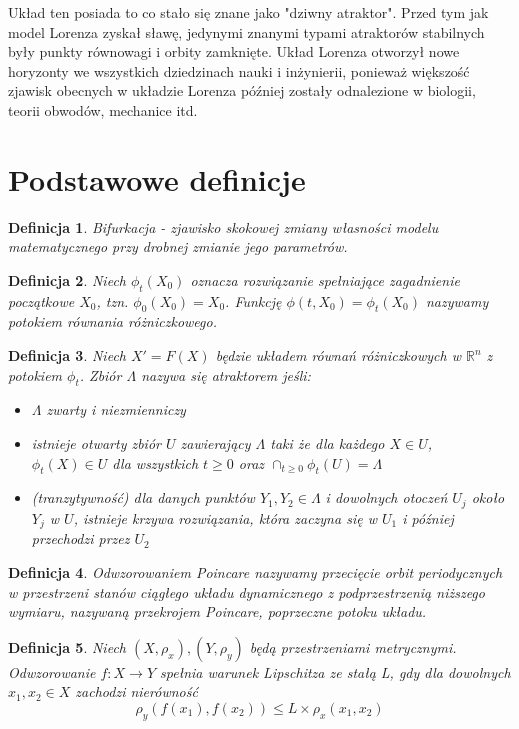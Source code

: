 \documentclass[12pt]{report}
\newtheorem{definition}{Definicja}
\newcommand{\R}{\mathbb{R}}
\begin{document}
	\par Układ ten posiada to co stało się znane jako "dziwny atraktor". Przed tym jak model Lorenza zyskał sławę, jedynymi znanymi typami atraktorów stabilnych były punkty równowagi i orbity zamknięte. Układ Lorenza otworzył nowe horyzonty we wszystkich dziedzinach nauki i inżynierii, ponieważ większość zjawisk obecnych w układzie Lorenza później zostały odnalezione w biologii, teorii obwodów, mechanice itd. \cite{HSD}
	
	\section{Podstawowe definicje}
	\begin{definition}
		Bifurkacja - zjawisko skokowej zmiany własności modelu matematycznego przy drobnej zmianie jego parametrów.
	\end{definition}
	\begin{definition}
		Niech $\phi_t (X_0)$ oznacza rozwiązanie spełniające zagadnienie początkowe $X_0$, tzn. $\phi_0 (X_0) = X_0$. Funkcję $\phi(t, X_0) = \phi_t(X_0)$ nazywamy potokiem równania różniczkowego.
	\end{definition}
	\begin{definition}
		Niech $X' = F(X)$ będzie układem równań różniczkowych w $\R^n$ z potokiem $\phi_t$. Zbiór $\Lambda$ nazywa się atraktorem jeśli:
		\begin{itemize}
			\item $\Lambda$ zwarty i niezmienniczy
			\item istnieje otwarty zbiór $U$ zawierający $\Lambda$ taki że dla każdego $X \in U$, $\phi_t(X) \in U$ dla wszystkich $t \ge 0$ oraz $\cap_{t \ge 0} \phi_t(U) = \Lambda$
			\item (tranzytywność) dla danych punktów $Y_1, Y_2 \in \Lambda$ i dowolnych otoczeń $U_j$ około $Y_j$ w $U$, istnieje krzywa rozwiązania, która zaczyna się w $U_1$ i później przechodzi przez $U_2$
		\end{itemize}
	\end{definition}
	\begin{definition}
		Odwzorowaniem Poincare nazywamy przecięcie orbit periodycznych w przestrzeni stanów ciągłego układu dynamicznego z podprzestrzenią niższego wymiaru, nazywaną przekrojem Poincare, poprzeczne potoku układu.
	\end{definition}
	\begin{definition}
		Niech $(X, \rho_x), (Y, \rho_y)$ będą przestrzeniami metrycznymi. Odwzorowanie $f: X \to Y$ spełnia warunek Lipschitza ze stałą L, gdy dla dowolnych $x_1, x_2 \in X$ zachodzi nierówność
		\[ \rho_y(f(x_1), f(x_2)) \le L \times \rho_x(x_1, x_2) \]
	\end{definition}
\end{document}
